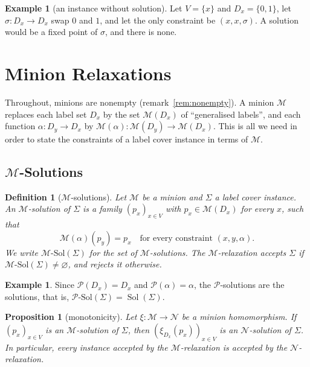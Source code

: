 \documentclass[11pt]{article}
\theoremstyle{plain}
\newtheorem{proposition}[theorem]{Proposition}
\newtheorem{definition}[theorem]{Definition}
\theoremstyle{definition}
\newtheorem{example}[theorem]{Example}
\newcommand{\Sol}{\operatorname{Sol}}
\newcommand{\Solm}[1]{#1\text{-}\mathrm{Sol}}
\newcommand{\Pm}{\mathscr{P}}
\newcommand{\M}{\mathscr{M}}
\newcommand{\N}{\mathscr{N}}
\begin{document}
\begin{example}[an instance without solution]\label{ex:swap}
Let $V=\{x\}$ and $D_x=\{0,1\}$, let $\sigma\colon D_x\to D_x$ swap $0$ and $1$, and let the only constraint be $(x,x,\sigma)$. A solution would be a fixed point of $\sigma$, and there is none.
\end{example}

\section{Minion Relaxations}\label{sec:relax}

Throughout, minions are nonempty (remark~\ref{rem:nonempty}). A minion $\M$ replaces each label set $D_x$ by the set $\M(D_x)$ of ``generalised labels'', and each function $\alpha\colon D_y\to D_x$ by $\M(\alpha)\colon\M(D_y)\to\M(D_x)$. This is all we need in order to state the constraints of a label cover instance in terms of $\M$.

\subsection{\texorpdfstring{$\M$}{M}-Solutions}

\begin{definition}[$\M$-solutions]
Let $\M$ be a minion and $\Sigma$ a label cover instance. An \emph{$\M$-solution} of $\Sigma$ is a family $(p_x)_{x\in V}$ with $p_x\in\M(D_x)$ for every $x$, such that
\[
\M(\alpha)(p_y)=p_x\quad\text{for every constraint } (x,y,\alpha).
\]
We write $\Solm{\M}(\Sigma)$ for the set of $\M$-solutions. The \emph{$\M$-relaxation} accepts $\Sigma$ if $\Solm{\M}(\Sigma)\neq\varnothing$, and rejects it otherwise.
\end{definition}

\begin{example}\label{ex:proj}
Since $\Pm(D_x)=D_x$ and $\Pm(\alpha)=\alpha$, the $\Pm$-solutions are the solutions, that is, $\Solm{\Pm}(\Sigma)=\Sol(\Sigma)$.
\end{example}

\begin{proposition}[monotonicity]\label{prop:monotone}
Let $\xi\colon\M\to\N$ be a minion homomorphism. If $(p_x)_{x\in V}$ is an $\M$-solution of $\Sigma$, then $(\xi_{D_x}(p_x))_{x\in V}$ is an $\N$-solution of $\Sigma$. In particular, every instance accepted by the $\M$-relaxation is accepted by the $\N$-relaxation.
\end{proposition}
\end{document}
